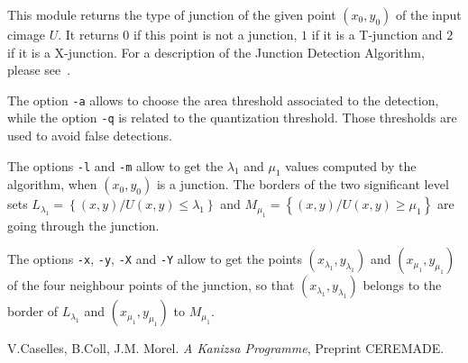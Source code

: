 This module returns the type of junction of the given point $(x_0,y_0)$
of the input cimage $U$. 
It returns $0$ if this point is not a junction, $1$ if it is a T-junction
and $2$ if it is a X-junction.
For a description of the Junction Detection Algorithm, please
see~\cite{KP}.

The option \verb+-a+ allows to choose the area threshold associated
to the detection, while the option \verb+-q+ is related to the quantization 
threshold. Those thresholds are used to avoid false detections.

The options \verb+-l+ and \verb+-m+ allow to get the $\lambda_1$ and
$\mu_1$ values computed by the algorithm, when  $(x_0,y_0)$ is a junction.
The borders of the two significant level sets 
$L_{\lambda_1} = \left\{(x,y) /U(x,y) \leq \lambda_1 \right\}$ and 
$M_{\mu_1} = \left\{(x,y) /U(x,y) \geq \mu_1 \right\}$ are going 
through the junction.

The options \verb+-x+, \verb+-y+, \verb+-X+ and \verb+-Y+ allow to get
the points $(x_{\lambda_1}, y_{\lambda_1})$ 
and $(x_{\mu_1}, y_{\mu_1})$ of the
four neighbour points of the junction, so that 
$(x_{\lambda_1}, y_{\lambda_1})$ belongs to the border of 
$L_{\lambda_1}$ and  $(x_{\mu_1}, y_{\mu_1})$ to $M_{\mu_1}$.

\begin{thebibliography}{Dau1}
 V.Caselles, B.Coll, J.M. Morel.
{\em A Kanizsa Programme}, Preprint CEREMADE.
\end{thebibliography}